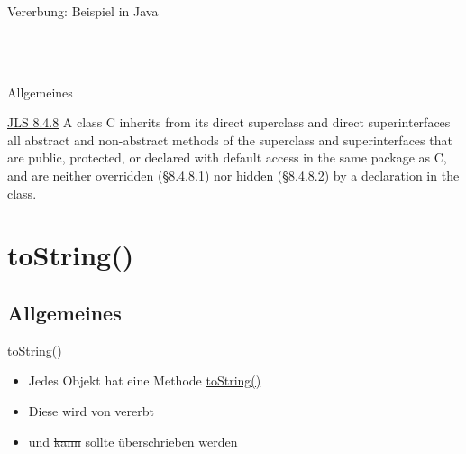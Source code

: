 \documentclass[usepdftitle=false,hyperref={pdfpagelabels=false}]{beamer}
\begin{document}

\begin{frame}{Vererbung: Beispiel in Java}
    \begin{minipage}[b]{0.45\linewidth}
        \inputminted[linenos=false, numbersep=5pt, tabsize=4, fontsize=\tiny, label=Animal.java, frame=lines]{java}{Animal.java}
        \inputminted[linenos=false, numbersep=5pt, tabsize=4, fontsize=\tiny, label=Jungle.java, frame=lines]{java}{Jungle.java}
    \end{minipage}
    \hspace{0.5cm}
    \begin{minipage}[b]{0.45\linewidth}
        \inputminted[linenos=false, numbersep=5pt, tabsize=4, fontsize=\tiny, label=Tiger.java, frame=lines]{java}{Tiger.java}
        \inputminted[linenos=false, numbersep=5pt, tabsize=4, fontsize=\tiny, label=Cat.java, frame=lines]{java}{Cat.java}
    \end{minipage}
\end{frame}

\begin{frame}{Allgemeines}
    \begin{block}{\href{http://docs.oracle.com/javase/specs/jls/se7/html/jls-8.html\#jls-8.4.8}{JLS 8.4.8}}
    A class C inherits from its direct superclass and direct 
    superinterfaces all abstract and non-abstract methods of the 
    superclass and superinterfaces that are public, protected, or 
    declared with default access in the same package as C, and are 
    neither overridden (§8.4.8.1) nor hidden (§8.4.8.2) by a 
    declaration in the class.
    \end{block}
\end{frame}

\section{toString()}
\subsection{Allgemeines}
\begin{frame}{toString()}
    \begin{itemize}[<+->]
        \item Jedes Objekt hat eine Methode \href{http://docs.oracle.com/javase/7/docs/api/java/lang/Object.html\#toString()}{toString()}
        \item Diese wird von  vererbt
        \item und \st{kann} sollte überschrieben werden
    \end{itemize}
\end{frame}
\end{document}
